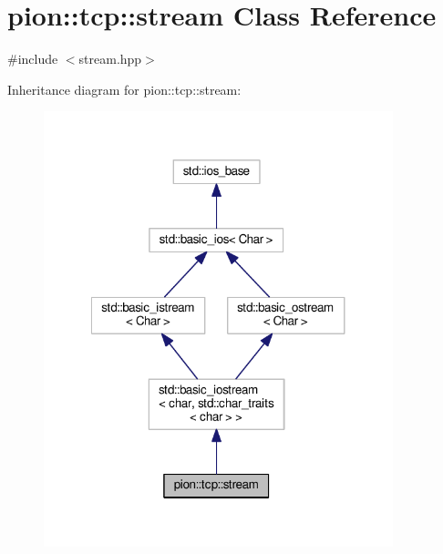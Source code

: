 \hypertarget{classpion_1_1tcp_1_1stream}{\section{pion\-:\-:tcp\-:\-:stream Class Reference}
\label{classpion_1_1tcp_1_1stream}
}


{\ttfamily \#include $<$stream.\-hpp$>$}



Inheritance diagram for pion\-:\-:tcp\-:\-:stream\-:
\nopagebreak
\begin{figure}[H]
\begin{center}
\leavevmode
\includegraphics[width=287pt]{classpion_1_1tcp_1_1stream__inherit__graph}
\end{center}
\end{figure}


